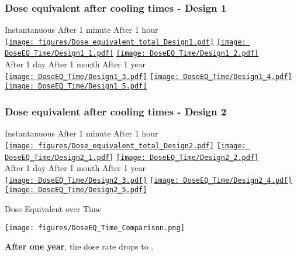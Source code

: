 \documentclass[xcolor={dvipsnames}]{beamer}
\begin{document}
\begin{frame}
  \frametitle{Dose equivalent after cooling times - \textbf{Design 1}}
  \hypertarget{coolingtimesprev_Design1}{}
  \begin{center}
    \hspace*{1.2cm} Instantanuous \hfill After 1 minute \hfill After 1 hour \hspace*{1.5cm} \\
  \hyperlink{Dose_equivalent_Design1}{\texttt{[image: figures/Dose\_equivalent\_total\_Design1.pdf]}}
  \hyperlink{Dose_equivalent_minute_Design1}{\texttt{[image: DoseEQ\_Time/Design1\_1.pdf]}}
  \hyperlink{Dose_equivalent_hour_Design1}{\texttt{[image: DoseEQ\_Time/Design1\_2.pdf]}}\\
    \hspace*{1.2cm} After 1 day \hfill After 1 month \hfill After 1 year\hspace*{1.5cm} \\
  \hyperlink{Dose_equivalent_day_Design1}{\texttt{[image: DoseEQ\_Time/Design1\_3.pdf]}}
  \hyperlink{Dose_equivalent_month_Design1}{\texttt{[image: DoseEQ\_Time/Design1\_4.pdf]}}
  \hyperlink{Dose_equivalent_year_Design1}{\texttt{[image: DoseEQ\_Time/Design1\_5.pdf]}}
 \end{center}
\end{frame}
\begin{frame}
  \frametitle{Dose equivalent after cooling times - \textbf{Design 2}}
  \hypertarget{coolingtimesprev_Design2}{}
  \begin{center}
    \hspace*{1.2cm} Instantanuous \hfill After 1 minute \hfill After 1 hour \hspace*{1.5cm} \\
  \hyperlink{Dose_equivalent_Design2}{\texttt{[image: figures/Dose\_equivalent\_total\_Design2.pdf]}}
  \hyperlink{Dose_equivalent_minute_Design2}{\texttt{[image: DoseEQ\_Time/Design2\_1.pdf]}}
  \hyperlink{Dose_equivalent_hour_Design2}{\texttt{[image: DoseEQ\_Time/Design2\_2.pdf]}}\\
    \hspace*{1.2cm} After 1 day \hfill After 1 month \hfill After 1 year\hspace*{1.5cm} \\
  \hyperlink{Dose_equivalent_day_Design2}{\texttt{[image: DoseEQ\_Time/Design2\_3.pdf]}}
  \hyperlink{Dose_equivalent_month_Design2}{\texttt{[image: DoseEQ\_Time/Design2\_4.pdf]}}
  \hyperlink{Dose_equivalent_year_Design2}{\texttt{[image: DoseEQ\_Time/Design2\_5.pdf]}}
 \end{center}
\end{frame}
\begin{frame}{Dose Equivalent over Time}
\begin{center}
  \texttt{[image: figures/DoseEQ\_Time\_Comparison.png]}
\end{center}
\textbf{After one year}, the dose rate drops to \textbf{}.
\end{frame}
\end{document}

